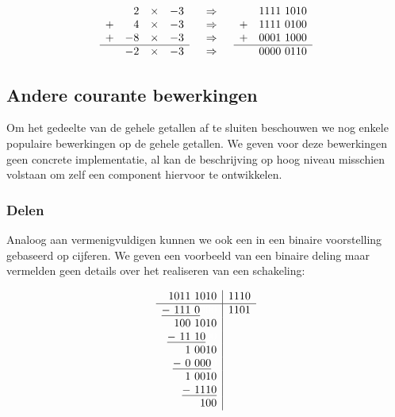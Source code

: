 \begin{equation}
\begin{array}{lcr}
\begin{array}{lrcr}
&2&\times&-3\\
+&4&\times&-3\\
+&-8&\times&-3\\\hline
&-2&\times&-3
\end{array}&\begin{array}{c}
\Rightarrow\\
\Rightarrow\\
\Rightarrow\\
\Rightarrow
\end{array}&\begin{array}{lr}
&1111\ 1010\\
+&1111\ 0100\\
+&0001\ 1000\\\hline
&0000\ 0110
\end{array}
\end{array}
\end{equation}

\subsection{Andere courante bewerkingen}
Om het gedeelte van de gehele getallen af te sluiten beschouwen we nog enkele populaire bewerkingen op de gehele getallen. We geven voor deze bewerkingen geen concrete implementatie, al kan de beschrijving op hoog niveau misschien volstaan om zelf een component hiervoor te ontwikkelen.

\subsubsection{Delen}
Analoog aan vermenigvuldigen kunnen we ook een  in een binaire voorstelling gebaseerd op cijferen. We geven een voorbeeld van een binaire deling maar vermelden geen details over het realiseren van een schakeling:

\begin{equation}
\begin{array}{r|l}
1011\ 1010&1110\\\hline
\underline{-\ 111\ 0}\textcolor{white}{000}&1101\\
100\ 1010&\\
\underline{-\ 11\ 10}\textcolor{white}{00}&\\
1\ 0010&\\
\underline{-\ 0\ 000}\textcolor{white}{0}&\\
1\ 0010&\\
\underline{-\ 1110}&\\
100&
\end{array}
\end{equation}

